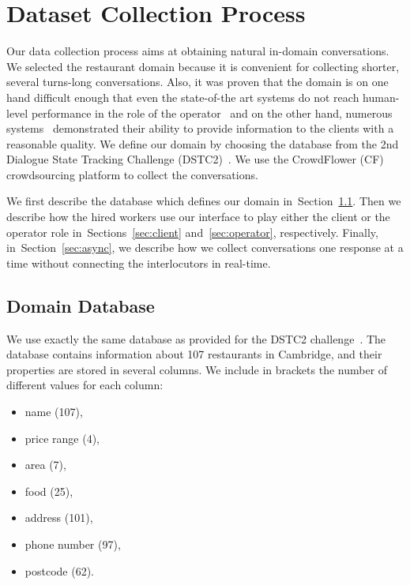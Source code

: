 \documentclass[runningheads,a4paper]{llncs}
\def\OD#1{{\color{darkgreen}OD: \it #1}}
\begin{document}
\section{Dataset Collection Process} \label{sec:collection}
\vspace{-0.50em}
Our data collection process aims at obtaining natural in-domain conversations.
We selected the restaurant domain because it is convenient for collecting shorter, several turns-long conversations.
Also, it was proven that the domain is on one hand difficult enough that even the state-of-the art systems do not reach human-level performance in the role of the operator~\cite{henderson2014dstc2} and on the other hand, numerous systems~\cite{young2010hidden,gasic2011line,wen2016network} demonstrated their ability to provide information to the clients with a reasonable quality.
We define our domain by choosing the database from the 2nd Dialogue State Tracking Challenge (DSTC2)~\cite{henderson2014dstc2}.
We use the CrowdFlower (CF) crowdsourcing platform to collect the conversations.

We first describe the database which defines our domain in~Section~\ref{sec:db}.
Then we describe how the hired workers use our interface to play either the client or the operator role in~Sections~\ref{sec:client} and~\ref{sec:operator}, respectively.
Finally, in~Section~\ref{sec:async}, we describe how we collect conversations one response at a time without connecting the interlocutors in real-time. 

\vspace{-1.00em}
\subsection{Domain Database}
\label{sec:db}

We use exactly the same database as provided for the DSTC2 challenge~\cite{henderson2014dstc2}.
The database contains information about 107 restaurants in Cambridge, and their properties are stored in several columns.
We include in brackets the number of different values for each column:
\vspace{-0.50em}
\begin{itemize}  %
    \item name (107),
    \item price range (4),
    \item area (7),
    \item food (25),
    \item address (101),
    \item phone number (97),
    \item postcode (62).
\end{itemize}
\vspace{-0.50em}
\end{document}
